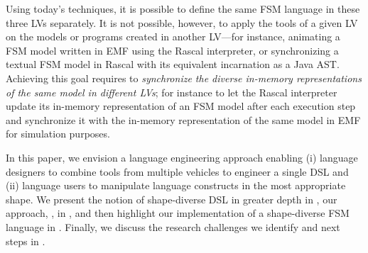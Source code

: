 Using today's techniques, it is possible to define the same FSM language in these three LVs separately.
It is not possible, however, to apply the tools of a given LV on the models or programs created in another LV---for instance, animating a FSM model written in EMF using the Rascal interpreter, or synchronizing a textual FSM model in Rascal with its equivalent incarnation as a Java AST.
Achieving this goal requires to \emph{synchronize the diverse in-memory representations of the same model in different LVs}; for instance to let the Rascal interpreter update its in-memory representation of an FSM model after each execution step and synchronize it with the in-memory representation of the same model in EMF for simulation purposes.

In this paper, we envision a language engineering approach enabling (i) language designers to combine tools from multiple vehicles to engineer a single DSL and (ii) language users to manipulate language constructs in the most appropriate shape.
We present the notion of shape-diverse DSL in greater depth in , our approach, \prism, in , and then highlight our implementation of a shape-diverse FSM language in .
Finally, we discuss the research challenges we identify and next steps in .
